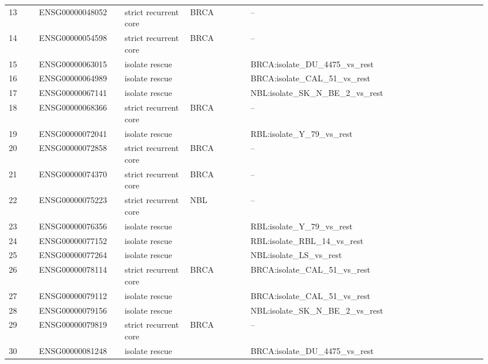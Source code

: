 \begin{landscape}
{\begin{longtable}{p{0.06\linewidth}p{0.17\linewidth}p{0.13\linewidth}p{0.12\linewidth}p{0.47\linewidth}}
13 & ENSG00000048052 & strict recurrent core & BRCA & -- \\
14 & ENSG00000054598 & strict recurrent core & BRCA & -- \\
15 & ENSG00000063015 & isolate rescue &  & BRCA:isolate\_\allowbreak{}DU\_\allowbreak{}4475\_\allowbreak{}vs\_\allowbreak{}rest \\
16 & ENSG00000064989 & isolate rescue &  & BRCA:isolate\_\allowbreak{}CAL\_\allowbreak{}51\_\allowbreak{}vs\_\allowbreak{}rest \\
17 & ENSG00000067141 & isolate rescue &  & NBL:isolate\_\allowbreak{}SK\_\allowbreak{}N\_\allowbreak{}BE\_\allowbreak{}2\_\allowbreak{}vs\_\allowbreak{}rest \\
18 & ENSG00000068366 & strict recurrent core & BRCA & -- \\
19 & ENSG00000072041 & isolate rescue &  & RBL:isolate\_\allowbreak{}Y\_\allowbreak{}79\_\allowbreak{}vs\_\allowbreak{}rest \\
20 & ENSG00000072858 & strict recurrent core & BRCA & -- \\
21 & ENSG00000074370 & strict recurrent core & BRCA & -- \\
22 & ENSG00000075223 & strict recurrent core & NBL & -- \\
23 & ENSG00000076356 & isolate rescue &  & RBL:isolate\_\allowbreak{}Y\_\allowbreak{}79\_\allowbreak{}vs\_\allowbreak{}rest \\
24 & ENSG00000077152 & isolate rescue &  & RBL:isolate\_\allowbreak{}RBL\_\allowbreak{}14\_\allowbreak{}vs\_\allowbreak{}rest \\
25 & ENSG00000077264 & isolate rescue &  & NBL:isolate\_\allowbreak{}LS\_\allowbreak{}vs\_\allowbreak{}rest \\
26 & ENSG00000078114 & strict recurrent core & BRCA & BRCA:isolate\_\allowbreak{}CAL\_\allowbreak{}51\_\allowbreak{}vs\_\allowbreak{}rest \\
27 & ENSG00000079112 & isolate rescue &  & BRCA:isolate\_\allowbreak{}CAL\_\allowbreak{}51\_\allowbreak{}vs\_\allowbreak{}rest \\
28 & ENSG00000079156 & isolate rescue &  & NBL:isolate\_\allowbreak{}SK\_\allowbreak{}N\_\allowbreak{}BE\_\allowbreak{}2\_\allowbreak{}vs\_\allowbreak{}rest \\
29 & ENSG00000079819 & strict recurrent core & BRCA & -- \\
30 & ENSG00000081248 & isolate rescue &  & BRCA:isolate\_\allowbreak{}DU\_\allowbreak{}4475\_\allowbreak{}vs\_\allowbreak{}rest \\

\end{longtable}}
\end{landscape}
